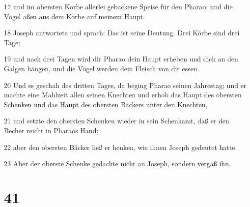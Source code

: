 \par 17 und im obersten Korbe allerlei gebackene Speise für den Pharao; und die Vögel aßen aus dem Korbe auf meinem Haupt.
\par 18 Joseph antwortete und sprach: Das ist seine Deutung. Drei Körbe sind drei Tage;
\par 19 und nach drei Tagen wird dir Pharao dein Haupt erheben und dich an den Galgen hängen, und die Vögel werden dein Fleisch von dir essen.
\par 20 Und es geschah des dritten Tages, da beging Pharao seinen Jahrestag; und er machte eine Mahlzeit allen seinen Knechten und erhob das Haupt des obersten Schenken und das Haupt des obersten Bäckers unter den Knechten,
\par 21 und setzte den obersten Schenken wieder in sein Schenkamt, daß er den Becher reicht in Pharaos Hand;
\par 22 aber den obersten Bäcker ließ er henken, wie ihnen Joseph gedeutet hatte.
\par 23 Aber der oberste Schenke gedachte nicht an Joseph, sondern vergaß ihn.

\chapter{41}

